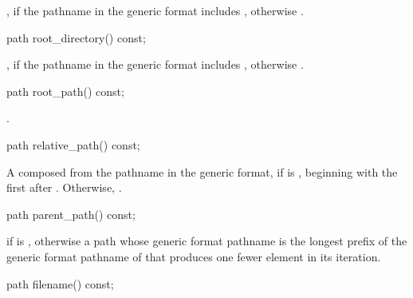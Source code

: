 \begin{itemdescr}
\pnum
\returns
{}, if the pathname in the generic format
includes , otherwise .
\end{itemdescr}

%
\begin{itemdecl}
path root_directory() const;
\end{itemdecl}

\begin{itemdescr}
\pnum
\returns
{}, if the pathname in the generic format
includes , otherwise .
\end{itemdescr}

%
\begin{itemdecl}
path root_path() const;
\end{itemdecl}

\begin{itemdescr}
\pnum
\returns
{}.
\end{itemdescr}

%
\begin{itemdecl}
path relative_path() const;
\end{itemdecl}

\begin{itemdescr}
\pnum
\returns
A  composed from the pathname in the generic format,
if  is , beginning
with the first  after . Otherwise, .
\end{itemdescr}

%
\begin{itemdecl}
path parent_path() const;
\end{itemdecl}

\begin{itemdescr}
\pnum
\returns
{} if  is ,
otherwise a path whose generic format pathname is
the longest prefix of the generic format pathname of 
that produces one fewer element in its iteration.
\end{itemdescr}

%
\begin{itemdecl}
path filename() const;
\end{itemdecl}

